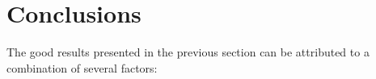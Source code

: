 \documentclass[final]{siamltex}
\begin{document}
% 
%         


\section{Conclusions}

The good results presented in the previous section can be attributed to
a combination of several factors:
\end{document}
